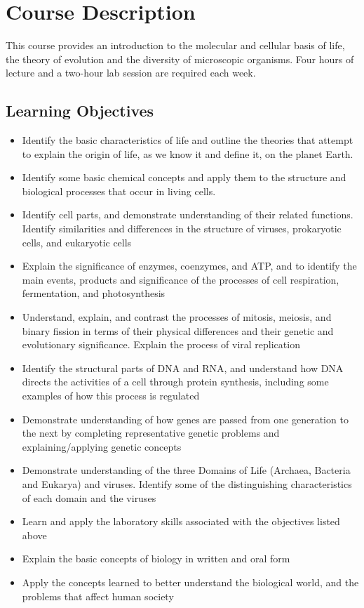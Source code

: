 \documentclass[]{book}
\theoremstyle{definition}
\theoremstyle{definition}
\theoremstyle{definition}
\theoremstyle{remark}
\begin{document}
\chapter{Course Description}\label{course-description}

This course provides an introduction to the molecular and cellular basis
of life, the theory of evolution and the diversity of microscopic
organisms. Four hours of lecture and a two-hour lab session are required
each week.

\section{Learning Objectives}\label{learning-objectives}

\begin{itemize}
\item
  Identify the basic characteristics of life and outline the theories
  that attempt to explain the origin of life, as we know it and define
  it, on the planet Earth.
\item
  Identify some basic chemical concepts and apply them to the structure
  and biological processes that occur in living cells.
\item
  Identify cell parts, and demonstrate understanding of their related
  functions. Identify similarities and differences in the structure of
  viruses, prokaryotic cells, and eukaryotic cells
\item
  Explain the significance of enzymes, coenzymes, and ATP, and to
  identify the main events, products and significance of the processes
  of cell respiration, fermentation, and photosynthesis
\item
  Understand, explain, and contrast the processes of mitosis, meiosis,
  and binary fission in terms of their physical differences and their
  genetic and evolutionary significance. Explain the process of viral
  replication
\item
  Identify the structural parts of DNA and RNA, and understand how DNA
  directs the activities of a cell through protein synthesis, including
  some examples of how this process is regulated
\item
  Demonstrate understanding of how genes are passed from one generation
  to the next by completing representative genetic problems and
  explaining/applying genetic concepts
\item
  Demonstrate understanding of the three Domains of Life (Archaea,
  Bacteria and Eukarya) and viruses. Identify some of the distinguishing
  characteristics of each domain and the viruses
\item
  Learn and apply the laboratory skills associated with the objectives
  listed above
\item
  Explain the basic concepts of biology in written and oral form
\item
  Apply the concepts learned to better understand the biological world,
  and the problems that affect human society
\end{itemize}
\end{document}

